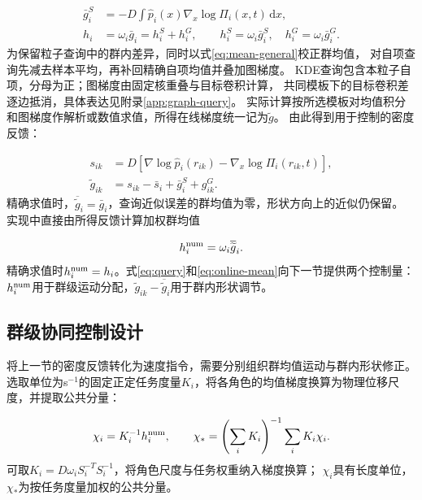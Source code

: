 \documentclass[UTF8,a4paper,11pt,fontset=none]{ctexart}
\begin{document}
\begin{equation}
\begin{aligned}
\bar g_i^S&=-D\int\widehat p_i(x)\nabla_x\log\Pi_i(x,t)\,\mathrm dx,\\
h_i&=\omega_i\bar g_i=h_i^S+h_i^G,\qquad
h_i^S=\omega_i\bar g_i^S,\quad h_i^G=\omega_i\bar g_i^G.
\end{aligned}
\label{eq:mean-general}
\end{equation}
为保留粒子查询中的群内差异，同时以式\eqref{eq:mean-general}校正群均值，
对自项查询先减去样本平均，再补回精确自项均值并叠加图梯度。
KDE查询包含本粒子自项，分母为正；图梯度由固定核重叠与目标卷积计算，
共同模板下的目标卷积差逐边抵消，具体表达见附录\ref{app:graph-query}。
实际计算按所选模板对均值积分和图梯度作解析或数值求值，所得在线梯度统一记为$\widetilde g$。
由此得到用于控制的密度反馈：

\begin{equation}
\begin{aligned}
s_{ik}&=D[\nabla\log\widehat p_i(r_{ik})-\nabla_x\log\Pi_i(r_{ik},t)],\\
\widetilde g_{ik}&=s_{ik}-\bar s_i+\bar g_i^S+g^G_{ik}.
\end{aligned}
\label{eq:query}
\end{equation}
精确求值时，$\overline{\widetilde g}_i=\bar g_i$，查询近似误差的群均值为零，形状方向上的近似仍保留。
实现中直接由所得反馈计算加权群均值

\begin{equation}
h_i^{\rm num}=\omega_i\overline{\widetilde g}_i .
\label{eq:online-mean}
\end{equation}
精确求值时$h_i^{\rm num}=h_i$。式\eqref{eq:query}和\eqref{eq:online-mean}向下一节提供两个控制量：
$h_i^{\rm num}$用于群级运动分配，$\widetilde g_{ik}-\overline{\widetilde g}_i$用于群内形状调节。

\subsection{群级协同控制设计}\label{sec:velocity-law}
将上一节的密度反馈转化为速度指令，需要分别组织群均值运动与群内形状修正。
选取单位为s$^{-1}$的固定正定任务度量$K_i$，将各角色的均值梯度换算为物理位移尺度，并提取公共分量：

\begin{equation}
\chi_i=K_i^{-1}h_i^{\rm num},\qquad
\chi_*=\left(\sum_iK_i\right)^{-1}\sum_iK_i\chi_i .
\label{eq:displacement}
\end{equation}
可取$K_i=D\omega_iS_i^{-T}S_i^{-1}$，将角色尺度与任务权重纳入梯度换算；
$\chi_i$具有长度单位，$\chi_*$为按任务度量加权的公共分量。
\end{document}
